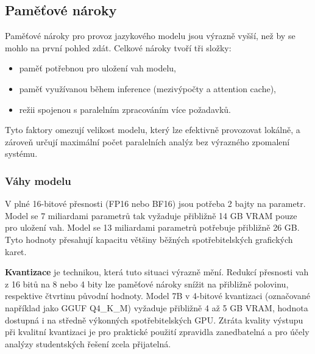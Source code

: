 \subsection{Paměťové nároky}
\label{subsec:llm-memory-requirements}

Paměťové nároky pro provoz jazykového modelu jsou výrazně vyšší, než by se mohlo na první pohled zdát.
Celkové nároky tvoří tři složky:

\begin{itemize}
    \item paměť potřebnou pro uložení vah modelu,
    \item paměť využívanou během inference (mezivýpočty a attention cache),
    \item režii spojenou s paralelním zpracováním více požadavků.
\end{itemize}

Tyto faktory omezují velikost modelu, který lze efektivně provozovat lokálně, a zároveň určují maximální počet paralelních analýz bez výrazného zpomalení systému.

\subsubsection*{Váhy modelu}

V plné 16-bitové přesnosti (FP16 nebo BF16) jsou potřeba 2 bajty na parametr.
Model se 7 miliardami parametrů tak vyžaduje přibližně 14 GB VRAM pouze pro uložení vah.
Model se 13 miliardami parametrů potřebuje přibližně 26 GB\@.
Tyto hodnoty přesahují kapacitu většiny běžných spotřebitelských grafických karet.

\textbf{Kvantizace} je technikou, která tuto situaci výrazně mění.
Redukcí přesnosti vah z 16 bitů na 8 nebo 4 bity lze paměťové nároky snížit na přibližně polovinu, respektive čtvrtinu původní hodnoty.
Model 7B v 4-bitové kvantizaci (označované například jako GGUF Q4\_K\_M) vyžaduje přibližně 4 až 5 GB VRAM, hodnota dostupná i na středně výkonných spotřebitelských GPU\@.
Ztráta kvality výstupu při kvalitní kvantizaci je pro praktické použití zpravidla zanedbatelná a pro účely analýzy studentských řešení zcela přijatelná.

